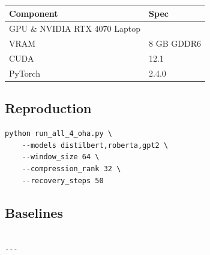\begin{table}[H]
\centering
\small
\begin{tabular}{ll}
\toprule
\textbf{Component} & \textbf{Spec} \\
\midrule
GPU \& NVIDIA RTX 4070 Laptop \\
VRAM & 8 GB GDDR6 \\
CUDA & 12.1 \\
PyTorch & 2.4.0 \\
\bottomrule
\end{tabular}
\end{table}

\subsection{Reproduction}

\begin{lstlisting}
python run_all_4_oha.py \
    --models distilbert,roberta,gpt2 \
    --window_size 64 \
    --compression_rank 32 \
    --recovery_steps 50
\end{lstlisting}

\subsection{Baselines}

\begin{lstlisting}

---
\end{lstlisting}